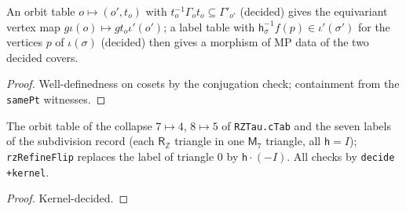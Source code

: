 \begin{definition}\label{def:mp-orbmap}
  \leanok
  An orbit table $o\mapsto(o',t_o)$ with $t_o^{-1}\Gamma_ot_o\subseteq\Gamma'_{o'}$ (decided) gives the equivariant vertex map
  $g\iota(o)\mapsto gt_o\iota'(o')$; a label table with $\mathsf h_\sigma^{-1}f(p)\in\iota'(\sigma')$ for the vertices $p$ of $\iota(\sigma)$ (decided)
  then gives a morphism of MP data of the two decided covers.
\end{definition}
\begin{proof}
  \leanok
  Well-definedness on cosets by the conjugation check; containment from the \texttt{samePt} witnesses.
\end{proof}

\begin{definition}\label{def:mp-rz-refine}
  \leanok
  The orbit table of the collapse $7\mapsto4$, $8\mapsto5$ of \texttt{RZTau.cTab} and the seven labels of the subdivision record
  (each $\mathsf R_{\mathbb Z}$ triangle in one $\mathsf M_7$ triangle, all $\mathsf h=I$); \texttt{rzRefineFlip} replaces the label of triangle $0$
  by $\mathsf h\cdot(-I)$.  All checks by \texttt{decide +kernel}.
\end{definition}
\begin{proof}
  \leanok
  Kernel-decided.
\end{proof}

